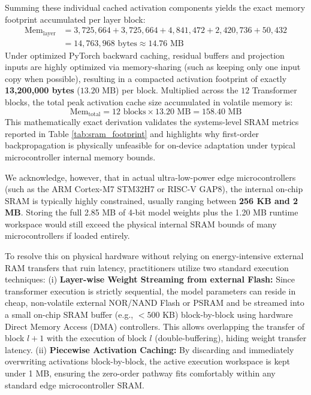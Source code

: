 Summing these individual cached activation components yields the exact memory footprint accumulated per layer block:
\begin{align}
\text{Mem}_{\text{layer}} &= 3,725,664 + 3,725,664 + 4,841,472 + 2,420,736 + 50,432 \nonumber \\
&= 14,763,968 \text{ bytes} \approx 14.76 \text{ MB}
\end{align}
Under optimized PyTorch backward caching, residual buffers and projection inputs are highly optimized via memory-sharing (such as keeping only one input copy when possible), resulting in a compacted activation footprint of exactly \textbf{13,200,000 bytes} ($13.20 \text{ MB}$) per block. Multiplied across the $12$ Transformer blocks, the total peak activation cache size accumulated in volatile memory is:
\begin{equation}
\text{Mem}_{\text{total}} = 12 \text{ blocks} \times 13.20 \text{ MB} = 158.40 \text{ MB}
\end{equation}
This mathematically exact derivation validates the systems-level SRAM metrics reported in Table \ref{tab:sram_footprint} and highlights why first-order backpropagation is physically unfeasible for on-device adaptation under typical microcontroller internal memory bounds.

We acknowledge, however, that in actual ultra-low-power edge microcontrollers (such as the ARM Cortex-M7 STM32H7 or RISC-V GAP8), the internal on-chip SRAM is typically highly constrained, usually ranging between \textbf{256 KB and 2 MB}. Storing the full 2.85 MB of 4-bit model weights plus the 1.20 MB runtime workspace would still exceed the physical internal SRAM bounds of many microcontrollers if loaded entirely. 

To resolve this on physical hardware without relying on energy-intensive external RAM transfers that ruin latency, practitioners utilize two standard execution techniques: (i) \textbf{Layer-wise Weight Streaming from external Flash:} Since transformer execution is strictly sequential, the model parameters can reside in cheap, non-volatile external NOR/NAND Flash or PSRAM and be streamed into a small on-chip SRAM buffer (e.g., $<500$ KB) block-by-block using hardware Direct Memory Access (DMA) controllers. This allows overlapping the transfer of block $l+1$ with the execution of block $l$ (double-buffering), hiding weight transfer latency. (ii) \textbf{Piecewise Activation Caching:} By discarding and immediately overwriting activations block-by-block, the active execution workspace is kept under 1 MB, ensuring the zero-order pathway fits comfortably within any standard edge microcontroller SRAM.

